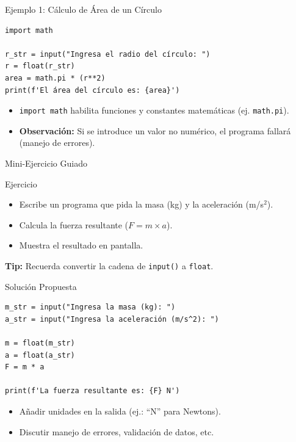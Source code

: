 \documentclass[10pt]{beamer}
\begin{document}
\begin{frame}[fragile]{Ejemplo 1: Cálculo de Área de un Círculo}
\begin{verbatim}
import math

r_str = input("Ingresa el radio del círculo: ")
r = float(r_str)
area = math.pi * (r**2)
print(f'El área del círculo es: {area}')
\end{verbatim}
\begin{itemize}
  \item \texttt{import math} habilita funciones y constantes matemáticas (ej. \texttt{math.pi}).
  \item \textbf{Observación:} Si se introduce un valor no numérico, el programa fallará (manejo de errores).
\end{itemize}
\end{frame}

\begin{frame}{Mini-Ejercicio Guiado}
\begin{block}{Ejercicio}
  \begin{itemize}
    \item Escribe un programa que pida la masa (kg) y la aceleración (m/s\(^2\)).
    \item Calcula la fuerza resultante (\(F = m \times a\)).
    \item Muestra el resultado en pantalla.
  \end{itemize}
\end{block}
\textbf{Tip:} Recuerda convertir la cadena de \texttt{input()} a \texttt{float}.
\end{frame}

\begin{frame}[fragile]{Solución Propuesta}
\begin{verbatim}
m_str = input("Ingresa la masa (kg): ")
a_str = input("Ingresa la aceleración (m/s^2): ")

m = float(m_str)
a = float(a_str)
F = m * a

print(f'La fuerza resultante es: {F} N')
\end{verbatim}
\begin{itemize}
  \item Añadir unidades en la salida (ej.: “N” para Newtons).
  \item Discutir manejo de errores, validación de datos, etc.
\end{itemize}
\end{frame}
\end{document}
